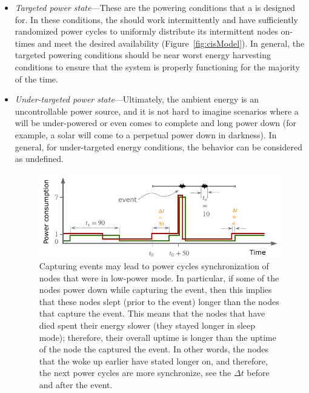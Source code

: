 \begin{itemize}[leftmargin=*]
	\item \textit{Targeted power state}---These are the powering conditions that a \cis is designed for. In these  conditions, the \cis should work intermittently and have sufficiently randomized power cycles to uniformly distribute its intermittent nodes on-times and meet the desired availability (Figure~\ref{fig:cisModel}). In general, the targeted powering conditions should be near worst energy harvesting conditions to ensure that the system is properly functioning for the majority of the time.
	\item \textit{Under-targeted power state}---Ultimately, the ambient energy is an uncontrollable power source, and it is not hard to imagine scenarios where a \cis will be under-powered or even comes to complete and long power down (for example, a solar \cis will come to a perpetual power down in darkness). In general, for under-targeted energy conditions, the \cis behavior can be considered as undefined.
%
\begin{figure}
	\centering
	\includegraphics[width=\columnwidth]{figures/hibernatingState}
	\caption{
	Capturing events may lead to power cycles synchronization of nodes that were in low-power mode. In particular, if some of the nodes power down while capturing the event, then this implies that these nodes slept (prior to the event) longer than the nodes that capture the event. This means that the nodes that have died spent their energy slower (they stayed longer in sleep mode); therefore,  their overall uptime is longer than the uptime of the node the captured the event. In other words, the nodes that the woke up earlier have stated longer on, and therefore, the next power cycles are more synchronize, see the $\Delta t$ before and after the event.
}
\end{figure}
\end{itemize}
